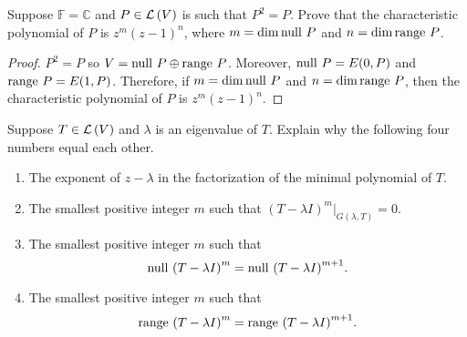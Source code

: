 \begin{exercise}\label{chapter8:sectionB:exercise17}
    Suppose $\mathbb{F} = \mathbb{C}$ and $P\in\mathcal{L}\left({V}\right)$ is such that $P^{2} = P$. Prove that the characteristic polynomial of $P$ is $z^{m}{(z - 1)}^{n}$, where $m = \dim\operatorname{null}\,{P}$ and $n = \dim\operatorname{range}\,{P}$.
\end{exercise}

\begin{proof}
    $P^{2} = P$ so $V = \operatorname{null}\,{P}\oplus\operatorname{range}\,{P}$. Moreover, $\operatorname{null}\,{P} = E(0, P)$ and $\operatorname{range}\,{P} = E(1, P)$. Therefore, if $m = \dim\operatorname{null}\,{P}$ and $n = \dim\operatorname{range}\,{P}$, then the characteristic polynomial of $P$ is $z^{m}{(z-1)}^{n}$.
\end{proof}
\newpage

\begin{exercise}\label{chapter8:sectionB:exercise18}
    Suppose $T\in\mathcal{L}\left({V}\right)$ and $\lambda$ is an eigenvalue of $T$. Explain why the following four numbers equal each other.
    \begin{enumerate}[label={(\alph*)}]
        \item The exponent of $z - \lambda$ in the factorization of the minimal polynomial of $T$.
        \item The smallest positive integer $m$ such that ${(T - \lambda I)}^{m}\vert_{G(\lambda, T)} = 0$.
        \item The smallest positive integer $m$ such that
              \[
                  \operatorname{null}\,{{(T - \lambda I)}^{m}} = \operatorname{null}\,{{(T - \lambda I)}^{m+1}}.
              \]
        \item The smallest positive integer $m$ such that
              \[
                  \operatorname{range}\,{{(T - \lambda I)}^{m}} = \operatorname{range}\,{{(T - \lambda I)}^{m+1}}.
              \]
    \end{enumerate}
\end{exercise}

